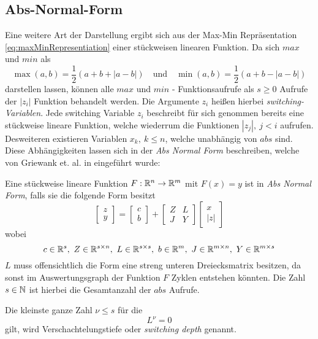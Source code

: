 \subsection{Abs-Normal-Form}
\label{sec:absNormalForm}
Eine weitere Art der Darstellung ergibt sich aus der Max-Min Repräsentation \eqref{eq:maxMinRepresentiation} einer stückweisen linearen Funktion.
Da sich $max$ und $min$ als
\[
\max(a,b) = \frac{1}{2}(a+b + |a-b|)\quad \text{und} \quad \min(a,b) = \frac{1}{2}(a+b - |a-b|)
\]
darstellen lassen, können alle $max$ und $min$ - Funktionsaufrufe als $s\geq 0$ Aufrufe der $|z_i|$ Funktion behandelt werden. Die Argumente $z_i$ heißen hierbei \textit{switching-Variablen}. Jede switching Variable $z_i$ beschreibt für sich genommen bereits eine stückweise lineare Funktion, welche wiederrum die Funktionen $|z_j|, ~j<i$ aufrufen. Desweiteren existieren Variablen $x_k, ~k\leq n$, welche unabhängig von $abs$ sind. Diese Abhängigkeiten lassen sich in der \textit{Abs Normal Form} beschreiben, welche von Griewank et. al. in \cite{plan} eingeführt wurde:
\begin{definition}
 Eine stückweise lineare Funktion $F:\mathbb{R}^n\to \mathbb{R}^m$ mit $F(x) = y$ ist in \textit{Abs Normal Form}, falls sie die folgende Form besitzt
 \begin{equation}
\label{eq:absNormalForm}
  \begin{bmatrix}
   z\\y
  \end{bmatrix}
  =
  \begin{bmatrix}
   c\\b
  \end{bmatrix}
  +
  \begin{bmatrix}
   Z & L\\
   J & Y
  \end{bmatrix}
  \begin{bmatrix}
   x\\|z|
  \end{bmatrix}
 \end{equation}
wobei 
\[
c\in \mathbb{R}^s, ~ Z\in \mathbb{R}^{s\times n},~ L\in\mathbb{R}^{s\times s}, ~ b\in\mathbb{R}^m, ~ J\in\mathbb{R}^{m\times n}, ~ Y\in \mathbb{R}^{m\times s} 
\]
$L$ muss offensichtlich die Form eine streng unteren Dreiecksmatrix besitzen, da sonst im Auswertungsgraph der Funktion $F$ Zyklen entstehen könnten. Die Zahl $s\in \mathbb{N}$ ist hierbei die Gesamtanzahl der $abs$ Aufrufe.
\end{definition}
Die kleinste ganze Zahl $\nu \leq s$ für die 
\[
 L^\nu =0
\]
gilt, wird Verschachtelungstiefe oder \textit{switching depth} genannt. 
